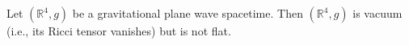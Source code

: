 Let $(\mathbb{R}^4, g)$ be a gravitational plane wave spacetime. Then $(\mathbb{R}^4, g)$ is vacuum (i.e., its Ricci tensor vanishes) but is not flat.
